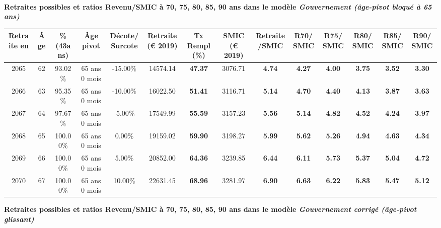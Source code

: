  ~\\{\bf \noindent Retraites possibles et ratios Revenu/SMIC à 70, 75, 80, 85, 90 ans dans le modèle \emph{Gouvernement (âge-pivot bloqué à 65 ans)}}  
 
\begin{adjustbox}{max width=\textwidth} 
\begin{tabular}[htb]{|c|c||c|c|c||c|c||c|c||c|c|c|c|c|} 
\hline 
 Retraite en &  Âge &  \%(43ans) &  Âge pivot &  Décote/Surcote &  Retraite (\euro{} 2019) &  Tx Rempl(\%) &  SMIC (\euro{} 2019) &  Retraite/SMIC &  R70/SMIC &  R75/SMIC &  R80/SMIC &  R85/SMIC &  R90/SMIC \\ 
\hline \hline 
 2065 &  62 &  93.02\% &  65 ans 0 mois &  -15.00\% &  14574.14 &  {\bf 47.37} &  3076.71 &  {\bf 4.74} &  {\bf 4.27} &  {\bf 4.00} &  {\bf 3.75} &  {\bf 3.52} &  {\bf 3.30} \\ 
\hline 
 2066 &  63 &  95.35\% &  65 ans 0 mois &  -10.00\% &  16022.50 &  {\bf 51.41} &  3116.71 &  {\bf 5.14} &  {\bf 4.70} &  {\bf 4.40} &  {\bf 4.13} &  {\bf 3.87} &  {\bf 3.63} \\ 
\hline 
 2067 &  64 &  97.67\% &  65 ans 0 mois &  -5.00\% &  17549.99 &  {\bf 55.59} &  3157.23 &  {\bf 5.56} &  {\bf 5.14} &  {\bf 4.82} &  {\bf 4.52} &  {\bf 4.24} &  {\bf 3.97} \\ 
\hline 
 2068 &  65 &  100.00\% &  65 ans 0 mois &  0.00\% &  19159.02 &  {\bf 59.90} &  3198.27 &  {\bf 5.99} &  {\bf 5.62} &  {\bf 5.26} &  {\bf 4.94} &  {\bf 4.63} &  {\bf 4.34} \\ 
\hline 
 2069 &  66 &  100.00\% &  65 ans 0 mois &  5.00\% &  20852.00 &  {\bf 64.36} &  3239.85 &  {\bf 6.44} &  {\bf 6.11} &  {\bf 5.73} &  {\bf 5.37} &  {\bf 5.04} &  {\bf 4.72} \\ 
\hline 
 2070 &  67 &  100.00\% &  65 ans 0 mois &  10.00\% &  22631.45 &  {\bf 68.96} &  3281.97 &  {\bf 6.90} &  {\bf 6.63} &  {\bf 6.22} &  {\bf 5.83} &  {\bf 5.47} &  {\bf 5.12} \\ 
\hline 
\hline 
\end{tabular} 
\end{adjustbox} 
 
 \vspace{0.1cm} 
{\bf \noindent Retraites possibles et ratios Revenu/SMIC à 70, 75, 80, 85, 90 ans dans le modèle \emph{Gouvernement corrigé (âge-pivot glissant)}}  
 
